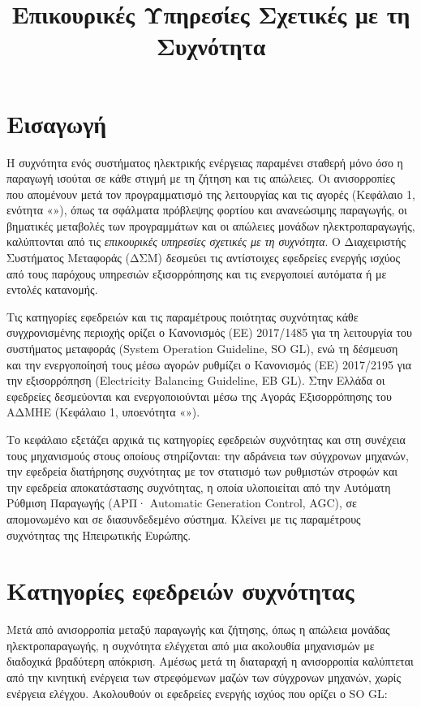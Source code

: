 \title{Επικουρικές Υπηρεσίες Σχετικές με τη Συχνότητα}

\section{Εισαγωγή}
\label{kef-03-theoria}

Η συχνότητα ενός συστήματος ηλεκτρικής ενέργειας παραμένει σταθερή μόνο όσο η παραγωγή ισούται
σε κάθε στιγμή με τη ζήτηση και τις απώλειες. Οι ανισορροπίες που απομένουν μετά τον
προγραμματισμό της λειτουργίας και τις αγορές (Κεφάλαιο 1, ενότητα «»),
όπως τα σφάλματα πρόβλεψης φορτίου και ανανεώσιμης παραγωγής, οι βηματικές μεταβολές των
προγραμμάτων και οι απώλειες μονάδων ηλεκτροπαραγωγής, καλύπτονται από τις \emph{επικουρικές
υπηρεσίες σχετικές με τη συχνότητα}. Ο Διαχειριστής Συστήματος Μεταφοράς (ΔΣΜ) δεσμεύει τις
αντίστοιχες εφεδρείες ενεργής ισχύος από τους παρόχους υπηρεσιών εξισορρόπησης και τις
ενεργοποιεί αυτόματα ή με εντολές κατανομής.

Τις κατηγορίες εφεδρειών και τις παραμέτρους ποιότητας συχνότητας κάθε συγχρονισμένης περιοχής
ορίζει ο Κανονισμός (ΕΕ) 2017/1485 για τη λειτουργία του συστήματος μεταφοράς (System
Operation Guideline, SO GL), ενώ τη δέσμευση και την ενεργοποίησή τους μέσω αγορών ρυθμίζει ο
Κανονισμός (ΕΕ) 2017/2195 για την εξισορρόπηση (Electricity Balancing Guideline, EB GL). Στην
Ελλάδα οι εφεδρείες δεσμεύονται και ενεργοποιούνται μέσω της Αγοράς Εξισορρόπησης του ΑΔΜΗΕ
(Κεφάλαιο 1, υποενότητα «»).

Το κεφάλαιο εξετάζει αρχικά τις κατηγορίες εφεδρειών συχνότητας και στη συνέχεια τους
μηχανισμούς στους οποίους στηρίζονται: την αδράνεια των σύγχρονων μηχανών, την εφεδρεία
διατήρησης συχνότητας με τον στατισμό των ρυθμιστών στροφών και την εφεδρεία αποκατάστασης
συχνότητας, η οποία υλοποιείται από την Αυτόματη Ρύθμιση Παραγωγής (ΑΡΠ· Automatic Generation
Control, AGC), σε απομονωμένο και σε διασυνδεδεμένο σύστημα. Κλείνει με τις παραμέτρους
συχνότητας της Ηπειρωτικής Ευρώπης.

\section{Κατηγορίες εφεδρειών συχνότητας}
\label{sec:reserves}

Μετά από ανισορροπία μεταξύ παραγωγής και ζήτησης, όπως η απώλεια μονάδας ηλεκτροπαραγωγής, η
συχνότητα ελέγχεται από μια ακολουθία μηχανισμών με διαδοχικά βραδύτερη απόκριση. Αμέσως μετά
τη διαταραχή η ανισορροπία καλύπτεται από την κινητική ενέργεια των στρεφόμενων μαζών των
σύγχρονων μηχανών, χωρίς ενέργεια ελέγχου. Ακολουθούν οι εφεδρείες ενεργής ισχύος που ορίζει ο
SO GL:

